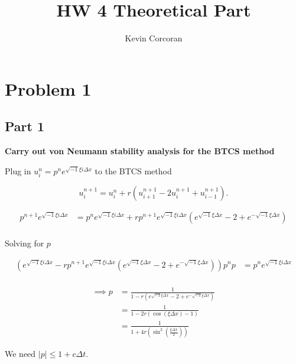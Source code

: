 \documentclass{article}
\title{HW 4 Theoretical Part}
\author{Kevin Corcoran}
\begin{document}
\maketitle

\section{Problem 1}%
\label{sec:problem_1}

\subsection{Part 1}%
\label{sub:part_1}

\textbf{Carry out von Neumann stability analysis for the BTCS method} 

\vspace{15px}
\par Plug in $u_{i}^{n} = p^{n}e^{\sqrt{-1}\xi i\Delta x}$ to the BTCS method

\[
u_{i}^{n+1}=u_{i}^{n} + r \left(u_{i+1}^{n+1}-2u_{i}^{n+1}+u_{i-1}^{n+1}\right)
.\] 

\begin{align*}
  p^{n+1}e^{\sqrt{-1}\xi i\Delta x} &= p^{n}e^{\sqrt{-1}\xi i\Delta x}
  + r p^{n+1}e^{\sqrt{-1}\xi i\Delta x} \left(e^{\sqrt{-1}\xi\Delta x}
  - 2 + e^{-\sqrt{-1}\xi\Delta x} \right) \\
\end{align*}

\par Solving for $p$

\begin{align*}
  \left(e^{\sqrt{-1}\xi i\Delta x} -  r p^{n+1}e^{\sqrt{-1}\xi i\Delta x} \left(e^{\sqrt{-1}\xi\Delta x}
  - 2 + e^{-\sqrt{-1}\xi\Delta x}\right)\right) p^{n}p &= p^{n}e^{\sqrt{-1}\xi
i\Delta x} \\
\end{align*}

\begin{align*}
\implies p &= \frac{1}{1 - r \left(e^{\sqrt{-1}\xi \Delta x}
- 2 + e^{-\sqrt{-1}\xi \Delta x}\right)} \\
           &= \frac{1}{1 - 2r \left(\cos(\xi\Delta x) - 1\right) } \\
 &= \frac{1}{1 + 4r \left( \sin^2( \frac{\xi\Delta x}{2})\right) } 
\end{align*}


\vspace{15px}
\par We need $|p| \leq 1 + c\Delta t$. 
\vspace{15px}
\end{document}
